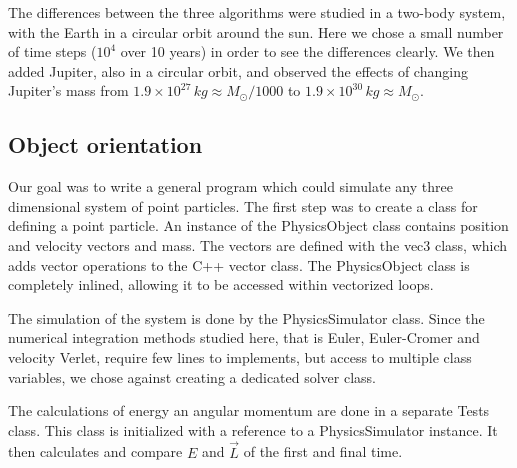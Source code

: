 \documentclass[a4paper,10pt,twocolumn]{article}
\newcommand{\ee}[1]{\!\times\!\!10^{#1}} 	%
\newcommand{\un}[1]{\,\si{#1}}		%
\begin{document}
The differences between the three algorithms were studied in a two-body system, with the Earth in a circular orbit around the sun. 
Here we chose a small number of time steps ($10^4$ over 10 years) in order to see the differences clearly. 
We then added Jupiter, also in a circular orbit, and observed the effects of changing Jupiter's mass from $1.9\ee{27}\un{kg} \approx M_\odot/1000$ to $1.9\ee{30}\un{kg} \approx M_\odot$.


\subsection*{Object orientation}

Our goal was to write a general program which could simulate any three dimensional system of point particles. 
The first step was to create a class for defining a point particle. An instance of the PhysicsObject class contains position and velocity vectors and mass. The vectors are defined with the vec3 class, which adds vector operations to the C++ vector class. 
The PhysicsObject class is completely inlined, allowing it to be accessed within vectorized loops. 

The simulation of the system is done by the PhysicsSimulator class. Since the numerical integration methods studied here, that is Euler, Euler-Cromer and velocity Verlet, require few lines to implements, but access to multiple class variables, we chose against creating a dedicated solver class.

The calculations of energy an angular momentum are done in a separate Tests class. This class is initialized with a reference to a PhysicsSimulator instance. It then calculates and compare $E$ and $\vec{L}$ of the first and final time. 

%
%
%
\end{document}
